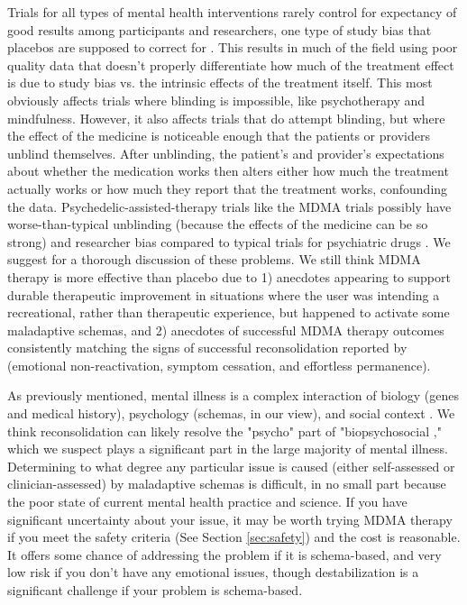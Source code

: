 \documentclass[12pt,letterpaper]{book}
\begin{document}
Trials for all types of mental health interventions rarely control for expectancy of good results among participants and researchers, one type of study bias that placebos are supposed to correct for \cite{hunekeExpectancy}. This results in much of the field using poor quality data that doesn't properly differentiate how much of the treatment effect is due to study bias vs. the intrinsic effects of the treatment itself. This most obviously affects trials where blinding is impossible, like psychotherapy and mindfulness. However, it also affects trials that do attempt blinding, but where the effect of the medicine is noticeable enough that the patients or providers unblind themselves. After unblinding, the patient's and provider's expectations about whether the medication works then alters either how much the treatment actually works or how much they report that the treatment works, confounding the data. Psychedelic-assisted-therapy trials like the MDMA trials possibly have worse-than-typical unblinding (because the effects of the medicine can be so strong) and researcher bias compared to typical trials for psychiatric drugs \cite{adayMethodologicalRigor}. We suggest \textcite{vanElkMethodology} for a thorough discussion of these problems. We still think MDMA therapy is more effective than placebo due to 1) anecdotes appearing to support durable therapeutic improvement in situations where the user was intending a recreational, rather than therapeutic experience, but happened to activate some maladaptive schemas, and 2) anecdotes of successful MDMA therapy outcomes consistently matching the signs of successful reconsolidation reported by \textcite{eckerUnlocking} (emotional non-reactivation, symptom cessation, and effortless permanence).

As previously mentioned, mental illness is a complex interaction of biology (genes and medical history), psychology (schemas, in our view), and social context \cite{engel1977need}. We think reconsolidation can likely resolve the "psycho" part of "biopsychosocial \cite{carhart2019rebus,eckerUnlocking}," which we suspect plays a significant part in the large majority of mental illness. Determining to what degree any particular issue is caused (either self-assessed or clinician-assessed) by maladaptive schemas is difficult, in no small part because the poor state of current mental health practice and science. If you have significant uncertainty about your issue, it may be worth trying MDMA therapy if you meet the safety criteria (See Section \ref{sec:safety}) and the cost is reasonable. It offers some chance of addressing the problem if it is schema-based, and very low risk if you don't have any emotional issues, though destabilization is a significant challenge if your problem is schema-based.
\label{psychogenic}
\end{document}
